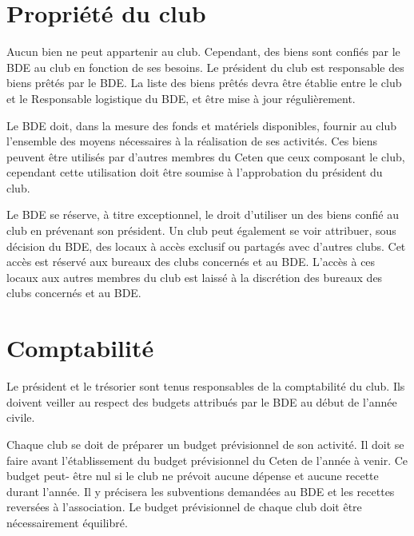 \documentclass{article} %
\begin{document}
\begin{multicols}{2}
{		}

		\section{Propriété du club}
		
		{\small
		
			Aucun bien ne peut appartenir au club. Cependant, des biens sont
			confiés par le BDE au club en fonction de ses besoins. Le président
			du club est responsable des biens prêtés par le BDE\@. La liste des
			biens prêtés devra être établie entre le club et le Responsable
			logistique du BDE, et être mise à jour régulièrement.

			Le BDE doit, dans la mesure des fonds et matériels disponibles,
			fournir au club l’ensemble des moyens nécessaires à la réalisation
			de ses activités. Ces biens peuvent être utilisés par d’autres
			membres du Ceten que ceux composant le club, cependant cette
			utilisation doit être soumise à l’approbation du président du club.

			Le BDE se réserve, à titre exceptionnel, le droit d’utiliser un des
			biens confié au club en prévenant son président. Un club peut
			également se voir attribuer, sous décision du BDE, des locaux à
			accès exclusif ou partagés avec d’autres clubs. Cet accès est
			réservé aux bureaux des clubs concernés et au BDE\@. L’accès à ces
			locaux aux autres membres du club est laissé à la discrétion des
			bureaux des clubs concernés et au BDE\@.
			
		}

		\section{Comptabilité}

		{\small

			Le président et le trésorier sont tenus responsables de la
			comptabilité du club. Ils doivent veiller au respect des
			budgets attribués par le BDE au début de l’année civile.
			
			Chaque club se doit de préparer un budget prévisionnel de
			son activité. Il doit se faire avant l’établissement du budget
			prévisionnel du Ceten de l’année à venir. Ce budget peut-
			être nul si le club ne prévoit aucune dépense et aucune
			recette durant l’année. Il y précisera les subventions
			demandées au BDE et les recettes reversées à l’association.
			Le budget prévisionnel de chaque club doit être
			nécessairement équilibré.
			
}
\end{multicols}
\end{document}
